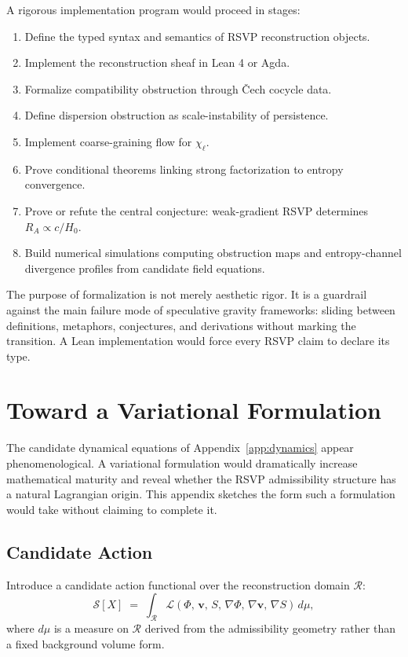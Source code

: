 \documentclass[11pt, a4paper]{article}
\theoremstyle{plain}
\theoremstyle{definition}
\theoremstyle{remark}
\newcommand{\RA}{R_{\!A}}
\newcommand{\recon}{\mathcal{R}}
\begin{document}
A rigorous implementation program would proceed in stages:
\begin{enumerate}[label=(\arabic*)]
  \item Define the typed syntax and semantics of RSVP reconstruction objects.
  \item Implement the reconstruction sheaf in Lean 4 or Agda.
  \item Formalize compatibility obstruction through \v{C}ech cocycle data.
  \item Define dispersion obstruction as scale-instability of persistence.
  \item Implement coarse-graining flow for $\chi_\ell$.
  \item Prove conditional theorems linking strong factorization to entropy convergence.
  \item Prove or refute the central conjecture: weak-gradient RSVP determines
    $\RA \propto c/H_0$.
  \item Build numerical simulations computing obstruction maps and entropy-channel
    divergence profiles from candidate field equations.
\end{enumerate}

The purpose of formalization is not merely aesthetic rigor. It is a guardrail against
the main failure mode of speculative gravity frameworks: sliding between definitions,
metaphors, conjectures, and derivations without marking the transition. A Lean
implementation would force every RSVP claim to declare its type.

\newpage
\section{Toward a Variational Formulation}
\label{app:variational}

The candidate dynamical equations of Appendix~\ref{app:dynamics} appear
phenomenological. A variational formulation would dramatically increase mathematical
maturity and reveal whether the RSVP admissibility structure has a natural Lagrangian
origin. This appendix sketches the form such a formulation would take without
claiming to complete it.

\subsection{Candidate Action}

Introduce a candidate action functional over the reconstruction domain $\recon$:
\begin{equation}
  \label{eq:action}
  \mathcal{S}[X] \;=\; \int_{\recon}
    \mathcal{L}\!\left(\Phi,\,\mathbf{v},\,S,\,\nabla\Phi,\,\nabla\mathbf{v},\,\nabla S\right)
    \,d\mu,
\end{equation}
where $d\mu$ is a measure on $\recon$ derived from the admissibility geometry rather
than a fixed background volume form.
\end{document}
